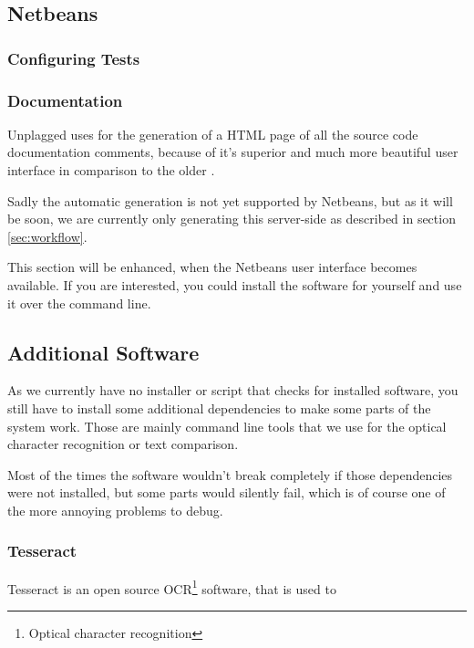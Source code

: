 \subsection{Netbeans}

\subsubsection{Configuring Tests}

\subsubsection{Documentation}

Unplagged uses \href{http://apigen.org/}{\citet{Apigen}} for the generation of a HTML page of all the source code documentation comments, 
because of it's superior and much more beautiful user interface in comparison to the older 
\href{http://www.phpdoc.org/}{\citet{PHPDocumentor}}.

Sadly the automatic generation is not yet supported by Netbeans, but as it will be soon\citep{Heise2012}, we are
currently only generating this server-side as described in section \ref{sec:workflow}. 

This section will be enhanced, when the Netbeans user interface becomes available. If you are interested, you could 
install the software for yourself and use it over the command line.

\subsection{Additional Software}

As we currently have no installer or script that checks for installed software, you still have to install some
additional dependencies to make some parts of the system work. Those are mainly command line tools that we use
for the optical character recognition or text comparison.

Most of the times the software wouldn't break completely if those dependencies were not installed, but some parts 
would silently fail, which is of course one of the more annoying problems to debug.

\subsubsection{Tesseract}

Tesseract is an open source OCR\footnote{Optical character recognition} software, that is used to

